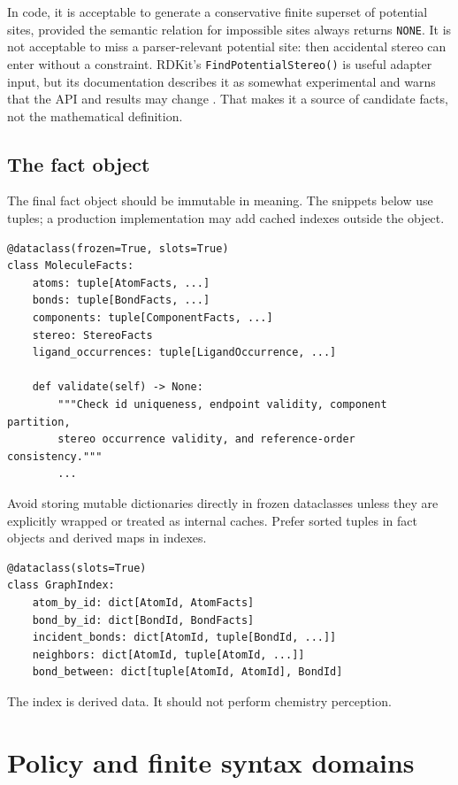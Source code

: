 \documentclass[10pt,a4paper]{article}
\theoremstyle{definition}
\theoremstyle{remark}
\begin{document}
In code, it is acceptable to generate a conservative finite superset of potential
sites, provided the semantic relation for impossible sites always returns
\texttt{NONE}.  It is not acceptable to miss a parser-relevant potential site:
then accidental stereo can enter without a constraint.  RDKit's
\texttt{FindPotentialStereo()} is useful adapter input, but its documentation
describes it as somewhat experimental and warns that the API and results may
change \cite{rdkit-findpotential}.  That makes it a source of candidate facts,
not the mathematical definition.

\subsection{The fact object}

The final fact object should be immutable in meaning.  The snippets below use
tuples; a production implementation may add cached indexes outside the object.

\begin{lstlisting}
@dataclass(frozen=True, slots=True)
class MoleculeFacts:
    atoms: tuple[AtomFacts, ...]
    bonds: tuple[BondFacts, ...]
    components: tuple[ComponentFacts, ...]
    stereo: StereoFacts
    ligand_occurrences: tuple[LigandOccurrence, ...]

    def validate(self) -> None:
        """Check id uniqueness, endpoint validity, component partition,
        stereo occurrence validity, and reference-order consistency."""
        ...
\end{lstlisting}

Avoid storing mutable dictionaries directly in frozen dataclasses unless they are
explicitly wrapped or treated as internal caches.  Prefer sorted tuples in fact
objects and derived maps in indexes.

\begin{lstlisting}
@dataclass(slots=True)
class GraphIndex:
    atom_by_id: dict[AtomId, AtomFacts]
    bond_by_id: dict[BondId, BondFacts]
    incident_bonds: dict[AtomId, tuple[BondId, ...]]
    neighbors: dict[AtomId, tuple[AtomId, ...]]
    bond_between: dict[tuple[AtomId, AtomId], BondId]
\end{lstlisting}

The index is derived data.  It should not perform chemistry perception.

\section{Policy and finite syntax domains}
\label{s:policy}
\end{document}
